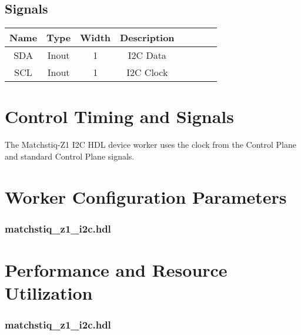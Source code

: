 \documentclass{article}
\def\comp{matchstiq\_z1\_i2c}
\edef\ecomp{matchstiq_z1_i2c}
\begin{document}
\begin{landscape}
	\section*{Signals}
	\begin{scriptsize}
	\begin{tabular}{|c|c|c|c|p{2.6cm}|c|c|c|}
		\hline
		\rowcolor{blue}
		Name & Type  & Width & Description \\
		\hline
		SDA  & Inout & 1     & I2C Data    \\
		\hline
		SCL  & Inout & 1     & I2C Clock   \\
		\hline
	\end{tabular}
	\end{scriptsize}
\end{landscape}

\section*{Control Timing and Signals}
The Matchstiq-Z1 I2C HDL device worker uses the clock from the Control Plane and standard Control Plane signals.

\begin{landscape}
\section*{Worker Configuration Parameters}
\subsubsection*{\comp.hdl}
%
\section*{Performance and Resource Utilization}
\subsubsection*{\comp.hdl}
%
\end{landscape}
\end{document}
